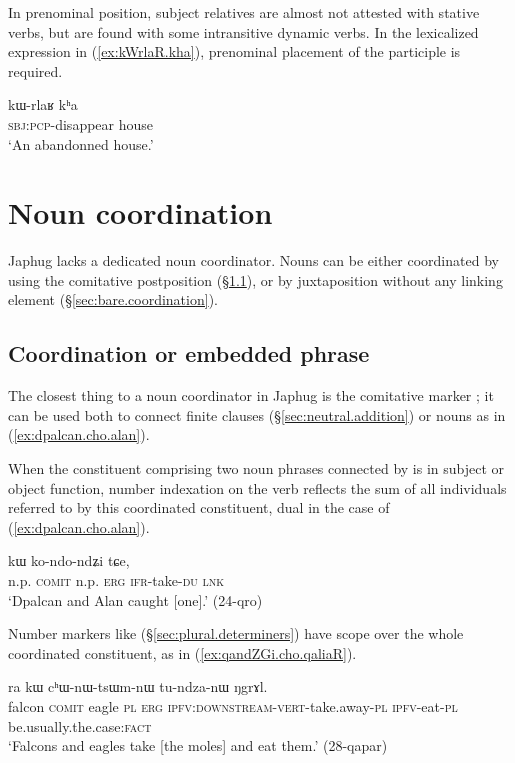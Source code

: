 In prenominal position, subject relatives are almost not attested with stative verbs, but are found with some intransitive dynamic verbs. In the lexicalized expression in (\ref{ex:kWrlaR.kha}), prenominal placement of the participle   is required.

\begin{exe}
\ex \label{ex:kWrlaR.kha}
\gll kɯ-rlaʁ kʰa \\
\textsc{sbj}:\textsc{pcp}-disappear house \\
\glt `An abandonned house.' 
\end{exe}

 \section{Noun coordination}
Japhug lacks a dedicated noun coordinator. Nouns can be either coordinated by using the comitative postposition  (§\ref{sec:coordinator.cho}), or by  juxtaposition without any linking element (§\ref{sec:bare.coordination}). 

\subsection{Coordination or embedded phrase} \label{sec:coordinator.cho}
The closest thing to a noun coordinator in Japhug is the comitative marker ; it can be used both to connect finite clauses (§\ref{sec:neutral.addition}) or nouns as in (\ref{ex:dpalcan.cho.alan}). 

When the constituent comprising two noun phrases connected by  is in subject or object function, number indexation on the verb reflects the sum of all individuals referred to by this coordinated constituent,  dual in the case of (\ref{ex:dpalcan.cho.alan}).

 \begin{exe}
\ex \label{ex:dpalcan.cho.alan}
  kɯ ko-ndo-ndʑi tɕe, \\
 n.p. \textsc{comit} n.p. \textsc{erg} \textsc{ifr}-take-\textsc{du} \textsc{lnk} \\
 \glt `Dpalcan and Alan caught [one].' (24-qro)
 \end{exe}
 
Number markers like  (§\ref{sec:plural.determiners}) have scope over the whole coordinated constituent, as in (\ref{ex:qandZGi.cho.qaliaR}).

\begin{exe}
\ex \label{ex:qandZGi.cho.qaliaR}
  ra kɯ cʰɯ-nɯ-tsɯm-nɯ tu-ndza-nɯ ŋgrɤl. \\
falcon \textsc{comit} eagle \textsc{pl} \textsc{erg} \textsc{ipfv}:\textsc{downstream}-\textsc{vert}-take.away-\textsc{pl} \textsc{ipfv}-eat-\textsc{pl} be.usually.the.case:\textsc{fact} \\
\glt `Falcons and eagles take [the moles] and eat them.' (28-qapar)
\end{exe}

